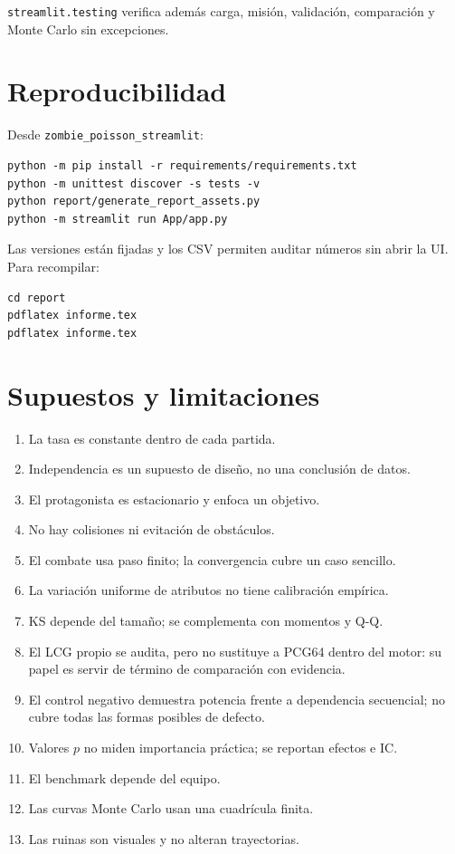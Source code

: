 \documentclass[11pt,a4paper]{article}
\begin{document}
\texttt{streamlit.testing} verifica además carga, misión, validación,
comparación y Monte Carlo sin excepciones.

\section{Reproducibilidad}

Desde \texttt{zombie\_poisson\_streamlit}:

\begin{verbatim}
python -m pip install -r requirements/requirements.txt
python -m unittest discover -s tests -v
python report/generate_report_assets.py
python -m streamlit run App/app.py
\end{verbatim}

Las versiones están fijadas y los CSV permiten auditar números sin abrir la UI.
Para recompilar:

\begin{verbatim}
cd report
pdflatex informe.tex
pdflatex informe.tex
\end{verbatim}

\section{Supuestos y limitaciones}

\begin{enumerate}
  \item La tasa es constante dentro de cada partida.
  \item Independencia es un supuesto de diseño, no una conclusión de datos.
  \item El protagonista es estacionario y enfoca un objetivo.
  \item No hay colisiones ni evitación de obstáculos.
  \item El combate usa paso finito; la convergencia cubre un caso sencillo.
  \item La variación uniforme de atributos no tiene calibración empírica.
  \item KS depende del tamaño; se complementa con momentos y Q-Q.
  \item El LCG propio se audita, pero no sustituye a PCG64 dentro del motor:
        su papel es servir de término de comparación con evidencia.
  \item El control negativo demuestra potencia frente a dependencia secuencial;
        no cubre todas las formas posibles de defecto.
  \item Valores $p$ no miden importancia práctica; se reportan efectos e IC.
  \item El benchmark depende del equipo.
  \item Las curvas Monte Carlo usan una cuadrícula finita.
  \item Las ruinas son visuales y no alteran trayectorias.
\end{enumerate}
\end{document}

